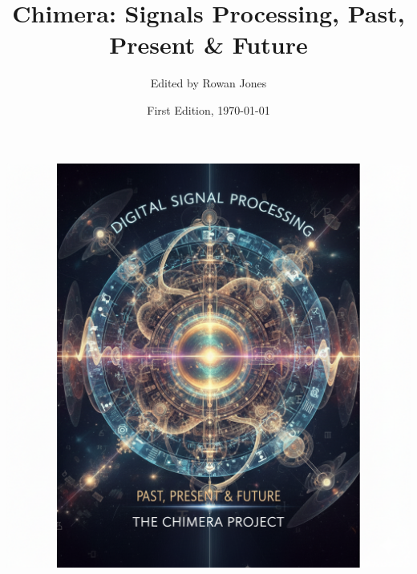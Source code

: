 \documentclass[12pt,a4paper,oneside]{book}
\title{Chimera: Signals Processing, Past, Present \& Future}
\author{Edited by Rowan Jones}
\date{First Edition, \today}
\begin{document}
\frontmatter

\begin{titlepage}
\centering
\includegraphics[width=\textwidth,height=\textheight,keepaspectratio]{graphics/cover_art.png}
\end{titlepage}


\end{document}
